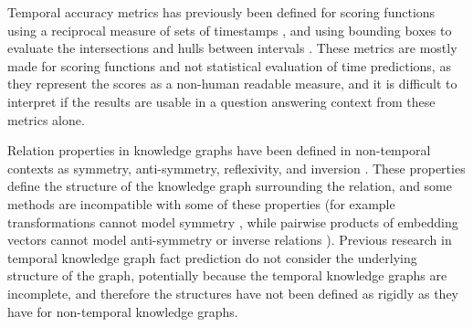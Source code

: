 Temporal accuracy metrics has previously been defined for scoring functions using a reciprocal measure of sets of timestamps \cite{surdeanu2013overviewtac}, and using bounding boxes to evaluate the intersections and hulls between intervals \cite{jain2020timeplex}. These metrics are mostly made for scoring functions and not statistical evaluation of time predictions, as they represent the scores as a non-human readable measure, and it is difficult to interpret if the results are usable in a question answering context from these metrics alone.

Relation properties in knowledge graphs have been defined in non-temporal contexts as symmetry, anti-symmetry, reflexivity, and inversion \cite{schmidt10relationalmathematics}. These properties define the structure of the knowledge graph surrounding the relation, and some methods are incompatible with some of these properties (for example transformations cannot model symmetry \cite{chami2020atth}, while pairwise products of embedding vectors cannot model anti-symmetry or inverse relations \cite{gregucci23sepa}). Previous research in temporal knowledge graph fact prediction do not consider the underlying structure of the graph, potentially because the temporal knowledge graphs are incomplete, and therefore the structures have not been defined as rigidly as they have for non-temporal knowledge graphs.

